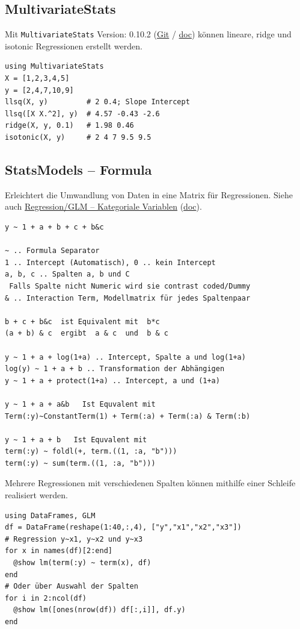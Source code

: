 \documentclass[10pt,twocolumn]{scrartcl}
\begin{document}
\subsection{MultivariateStats}

Mit \lstinline|MultivariateStats| Version: 0.10.2
(\href{https://github.com/JuliaStats/MultivariateStats.jl}{Git} /
\href{https://juliastats.org/MultivariateStats.jl}{doc}) können lineare, ridge
und isotonic Regressionen erstellt werden.

\begin{lstlisting}
using MultivariateStats
X = [1,2,3,4,5]
y = [2,4,7,10,9]
llsq(X, y)         # 2 0.4; Slope Intercept
llsq([X X.^2], y)  # 4.57 -0.43 -2.6
ridge(X, y, 0.1)   # 1.98 0.46
isotonic(X, y)     # 2 4 7 9.5 9.5
\end{lstlisting}

\subsection{StatsModels -- Formula}

Erleichtert die Umwandlung von Daten in eine Matrix für Regressionen. Siehe
auch \hyperref[ssec:kategorialeVariablen]{Regression/GLM -- Kategoriale
Variablen} (\href{https://juliastats.org/StatsModels.jl/stable/formula/}{doc}).

\begin{lstlisting}
y ~ 1 + a + b + c + b&c

~ .. Formula Separator
1 .. Intercept (Automatisch), 0 .. kein Intercept
a, b, c .. Spalten a, b und C
 Falls Spalte nicht Numeric wird sie contrast coded/Dummy
& .. Interaction Term, Modellmatrix für jedes Spaltenpaar

b + c + b&c  ist Equivalent mit  b*c
(a + b) & c  ergibt  a & c  und  b & c

y ~ 1 + a + log(1+a) .. Intercept, Spalte a und log(1+a)
log(y) ~ 1 + a + b .. Transformation der Abhängigen
y ~ 1 + a + protect(1+a) .. Intercept, a und (1+a)

y ~ 1 + a + a&b   Ist Equvalent mit
Term(:y)~ConstantTerm(1) + Term(:a) + Term(:a) & Term(:b)

y ~ 1 + a + b   Ist Equvalent mit
term(:y) ~ foldl(+, term.((1, :a, "b")))
term(:y) ~ sum(term.((1, :a, "b")))
\end{lstlisting}

Mehrere Regressionen mit verschiedenen Spalten können mithilfe einer Schleife
realisiert werden.

\begin{lstlisting}
using DataFrames, GLM
df = DataFrame(reshape(1:40,:,4), ["y","x1","x2","x3"])
# Regression y~x1, y~x2 und y~x3
for x in names(df)[2:end]
  @show lm(term(:y) ~ term(x), df)
end
# Oder über Auswahl der Spalten
for i in 2:ncol(df)
  @show lm([ones(nrow(df)) df[:,i]], df.y)
end
\end{lstlisting}
\end{document}
